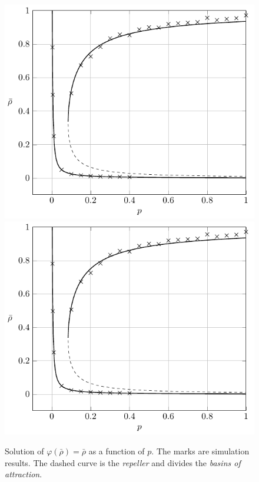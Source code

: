 \begin{figure}[htb]
    \centering
    \if{}
        \includegraphics[scale=0.9]{Figures/Ch8_rhoL_rhoH.pdf}
    \else
        \includegraphics[draft,scale=0.9]{Figures/Ch8_rhoL_rhoH.pdf}
    \fi
    \caption{Solution of $\varphi(\bar\rho)=\bar\rho$ as a function of $p$. The marks are simulation results. The dashed curve is the \textit{repeller} and divides the \textit{basins of attraction}.}
    \label{fig:rhoL_rhoH}
\end{figure}

